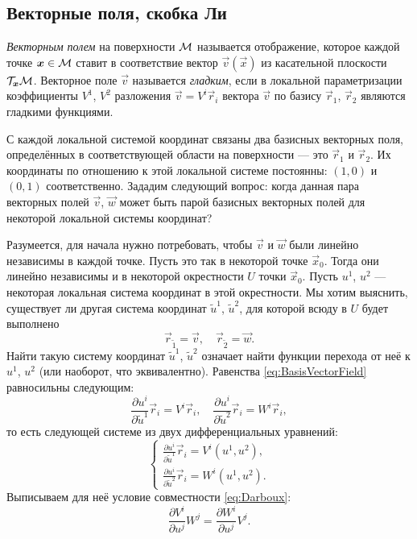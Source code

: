 
\subsection{Векторные поля, скобка Ли}

\begin{definition}
	\textit{Векторным полем} на поверхности $\mathcal{M}$ называется отображение, которое каждой точке $\boldsymbol{x} \in \mathcal{M}$ ставит в соответствие вектор $\vec{v}(\vec{x})$ из касательной плоскости $\mathcal{T}_{\boldsymbol{x}}\mathcal{M}$. Векторное поле $\vec{v}$ называется \textit{гладким}, если в локальной параметризации коэффициенты $V^1$, $V^2$ разложения
	$\vec{v} = V^i\vec{r}_i$ вектора $\vec{v}$ по базису $\vec{r}_1$, $\vec{r}_2$ являются гладкими функциями.
\end{definition}

С каждой локальной системой координат связаны два базисных векторных поля, определённых в соответствующей области на поверхности --- это $\vec{r}_1$ и $\vec{r}_2$. Их координаты по отношению к этой локальной системе постоянны: $(1, 0)$ и $(0, 1)$ соответственно. Зададим следующий вопрос: когда данная пара векторных полей $\vec{v}$, $\vec{w}$ может быть парой базисных векторных полей для некоторой локальной системы координат?

Разумеется, для начала нужно потребовать, чтобы $\vec{v}$ и $\vec{w}$ были линейно независимы в каждой точке. Пусть это так в некоторой точке $\vec{x}_0$. Тогда они линейно независимы и в некоторой окрестности $U$ точки $\vec{x}_0$. Пусть $u^1$, $u^2$ --- некоторая локальная система координат в этой окрестности. Мы хотим выяснить, существует ли другая система координат $\widetilde{u}^1$, $\widetilde{u}^2$, для которой всюду в $U$ будет выполнено
\begin{equation} \label{eq:BasisVectorField}
	\vec{r}_{\widetilde{1}} = \vec{v},\quad\vec{r}_{\widetilde{2}} = \vec{w}.
\end{equation}
Найти такую систему координат $\widetilde{u}^1$, $\widetilde{u}^2$ означает найти функции перехода от неё к $u^1$, $u^2$ (или наоборот, что эквивалентно). Равенства \eqref{eq:BasisVectorField} равносильны следующим:
\[
	\frac{\partial u^i}{\partial \widetilde{u}^1}\vec{r}_i = V^i\vec{r}_i,\quad
	\frac{\partial u^i}{\partial \widetilde{u}^2}\vec{r}_i = W^i\vec{r}_i,
\]
то есть следующей системе из двух дифференциальных уравнений:
\[
	\begin{cases}
		\frac{\partial u^i}{\partial\widetilde{u}^1}\vec{r}_i = V^i(u^1, u^2),\\
		\frac{\partial u^i}{\partial\widetilde{u}^2}\vec{r}_i = W^i(u^1, u^2).
	\end{cases}
\]
Выписываем для неё условие совместности \eqref{eq:Darboux}:
\[
	\frac{\partial V^i}{\partial u^j}W^j = \frac{\partial W^i}{\partial u^j}V^j.
\]

